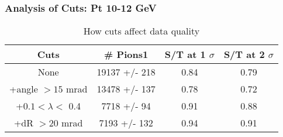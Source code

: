 \frame
{
\frametitle{Analysis of Cuts: Pt 10-12 GeV}
\begin{table}
\caption{How cuts affect data quality}
\centering
\begin{tabular}{c c c c}
\hline\hline
Cuts & \# Pions1 & S/T at 1 $\sigma$ & S/T at 2 $\sigma$ \\ [0.5ex]
\hline
None & 19137 +/-  218 & 0.84 & 0.79 \\ %
+angle $> 15$ mrad & 13478 +/-  137 & 0.78 & 0.72 \\ %
+$0.1 < \lambda <$ 0.4 & 7718 +/-   94 & 0.91 & 0.88 \\ %
+dR $> 20$ mrad & 7193 +/-  132 & 0.94 & 0.91 \\ %
[1ex]
\hline
\end{tabular}
\label{table:nonlin}
\end{table}
}
